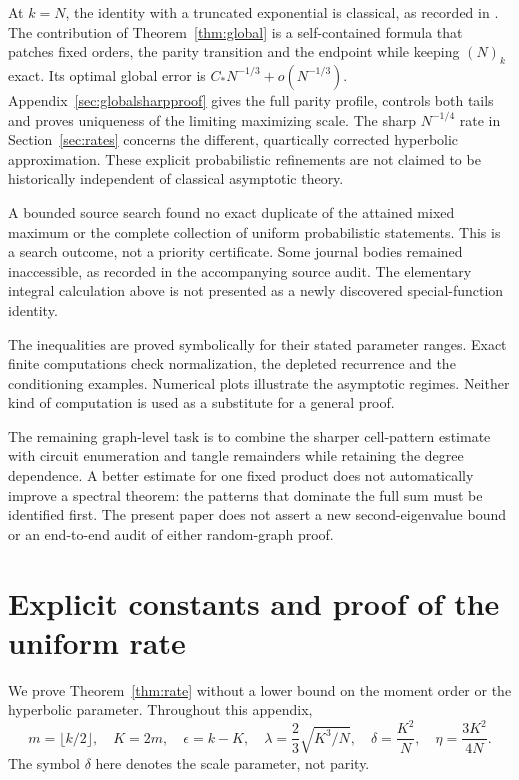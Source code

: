 \documentclass[11pt]{article}
\theoremstyle{definition}
\theoremstyle{remark}
\newcommand{\1}{\mathbf 1}
\begin{document}
At $k=N$, the identity with a truncated exponential is classical, as recorded in \cite[Section 1]{DMO}. The contribution of Theorem~\ref{thm:global} is a self-contained formula that patches fixed orders, the parity transition and the endpoint while keeping $(N)_k$ exact. Its optimal global error is $C_*N^{-1/3}+o(N^{-1/3})$. Appendix~\ref{sec:globalsharpproof} gives the full parity profile, controls both tails and proves uniqueness of the limiting maximizing scale. The sharp $N^{-1/4}$ rate in Section~\ref{sec:rates} concerns the different, quartically corrected hyperbolic approximation. These explicit probabilistic refinements are not claimed to be historically independent of classical asymptotic theory.

A bounded source search found no exact duplicate of the attained mixed maximum or the complete collection of uniform probabilistic statements. This is a search outcome, not a priority certificate. Some journal bodies remained inaccessible, as recorded in the accompanying source audit. The elementary integral calculation above is not presented as a newly discovered special-function identity.

The inequalities are proved symbolically for their stated parameter ranges. Exact finite computations check normalization, the depleted recurrence and the conditioning examples. Numerical plots illustrate the asymptotic regimes. Neither kind of computation is used as a substitute for a general proof.

The remaining graph-level task is to combine the sharper cell-pattern estimate with circuit enumeration and tangle remainders while retaining the degree dependence. A better estimate for one fixed product does not automatically improve a spectral theorem: the patterns that dominate the full sum must be identified first. The present paper does not assert a new second-eigenvalue bound or an end-to-end audit of either random-graph proof.


\clearpage
\section{Explicit constants and proof of the uniform rate}\label{sec:rateproof}

We prove Theorem~\ref{thm:rate} without a lower bound on the moment order or the hyperbolic parameter. Throughout this appendix,
\[
m=\lfloor k/2\rfloor,\quad K=2m,\quad\epsilon=k-K,\quad
\lambda=\frac23\sqrt{K^3/N},\quad
\delta=\frac{K^2}{N},\quad\eta=\frac{3K^2}{4N}.
\]
The symbol $\delta$ here denotes the scale parameter, not parity.
\end{document}
